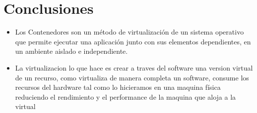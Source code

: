 \documentclass[preprint,12pt]{elsarticle}
\begin{document}
\section{Conclusiones}\label{sec:6}


\begin{itemize}
	\item Los Contenedores son un método de virtualización de un sistema operativo que permite ejecutar una aplicación junto con sus elementos dependientes, en un ambiente aislado e independiente.
	\item La virtualizacion lo que hace es crear a traves del software una version virtual de un recurso, como virtualiza de manera completa un software, consume los recursos del hardware tal como lo hicieramos en una maquina física reduciendo el rendimiento y el performance de la maquina que aloja a la virtual
\end{itemize}








	
	\newpage
	
	
	
\end{document}

